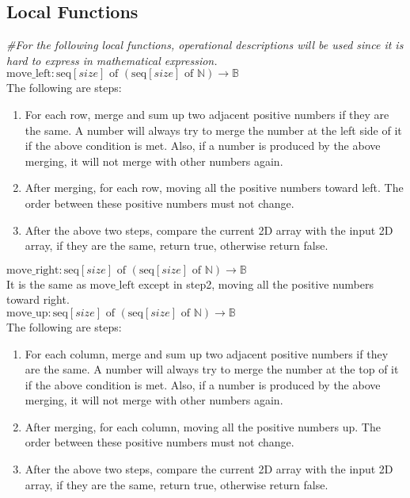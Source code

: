 \documentclass[12pt]{article}
\begin{document}
\newpage
\subsection*{Local Functions}
\noindent \textit{\#For the following local functions, operational descriptions will be used since it is hard to express in mathematical expression.}\\
\noindent $\mbox{move\_left} : \text{seq} [\mathit{size}] \text{ of } (\text{seq} [\mathit{size}] \text{ of } \mathbb{N}) \rightarrow \mathbb{B}$\\ The following are steps:
\begin{enumerate}
\item For each row, merge and sum up two adjacent positive numbers if they are the
same. A number will always try to merge the number at the left side 
of it if the above condition is met. Also, if a number is produced 
by the above merging, it will not merge with other numbers again.
\item After merging, for each row, moving all the positive numbers
toward left. The order between these positive numbers must not change.
\item After the above two steps, compare the current 2D array with
the input 2D array, if they are the same, return true, otherwise 
return false.
\end{enumerate}

\noindent $\mbox{move\_right} : \text{seq} [\mathit{size}] \text{ of } (\text{seq} [\mathit{size}] \text{ of } \mathbb{N}) \rightarrow \mathbb{B}$\\ It is the same as $\mbox{move\_left}$ except in step2, 
moving all the positive numbers toward right.\\

\noindent $\mbox{move\_up} : \text{seq} [\mathit{size}] \text{ of } (\text{seq} [\mathit{size}] \text{ of } \mathbb{N}) \rightarrow \mathbb{B}$\\ The following are steps:
\begin{enumerate}
\item For each column, merge and sum up two adjacent positive numbers if they are the
same. A number will always try to merge the number at the top of it if the above condition is met. Also, if a number is produced 
by the above merging, it will not merge with other numbers again.
\item After merging, for each column, moving all the positive numbers
up. The order between these positive numbers must not change.
\item After the above two steps, compare the current 2D array with
the input 2D array, if they are the same, return true, otherwise 
return false.
\end{enumerate}
\end{document}
